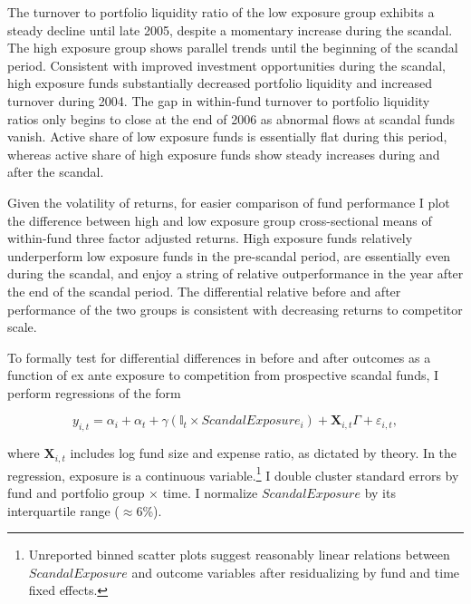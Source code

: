 \documentclass[openany]{book}
\let\rmarkdownfootnote\footnote%
\def\footnote{\protect\rmarkdownfootnote}
\theoremstyle{definition}
\theoremstyle{definition}
\theoremstyle{definition}
\theoremstyle{remark}
\begin{document}
The turnover to portfolio liquidity ratio of the low exposure group
exhibits a steady decline until late 2005, despite a momentary increase
during the scandal. The high exposure group shows parallel trends until
the beginning of the scandal period. Consistent with improved investment
opportunities during the scandal, high exposure funds substantially
decreased portfolio liquidity and increased turnover during 2004. The
gap in within-fund turnover to portfolio liquidity ratios only begins to
close at the end of 2006 as abnormal flows at scandal funds vanish.
Active share of low exposure funds is essentially flat during this
period, whereas active share of high exposure funds show steady
increases during and after the scandal.

Given the volatility of returns, for easier comparison of fund
performance I plot the difference between high and low exposure group
cross-sectional means of within-fund three factor adjusted returns. High
exposure funds relatively underperform low exposure funds in the
pre-scandal period, are essentially even during the scandal, and enjoy a
string of relative outperformance in the year after the end of the
scandal period. The differential relative before and after performance
of the two groups is consistent with decreasing returns to competitor
scale.

To formally test for differential differences in before and after
outcomes as a function of ex ante exposure to competition from
prospective scandal funds, I perform regressions of the form

\begin{equation}
y_{i,t} = \alpha_i + \alpha_t + \gamma \left( \mathbb{I}_t \times ScandalExposure_i \right) + \mathbf{X}_{i,t}\Gamma + \varepsilon_{i,t},
\label{eq:didReg}
\end{equation}

where \(\mathbf{X}_{i,t}\) includes log fund size and expense ratio, as
dictated by theory. In the regression, exposure is a continuous
variable.\footnote{
Unreported binned scatter plots suggest reasonably linear relations between $ScandalExposure$ and outcome variables after residualizing by fund and time fixed effects.
} I double cluster standard errors by fund and portfolio group
\(\times\) time. I normalize \(ScandalExposure\) by its interquartile
range (\(\approx 6\)\%).
\end{document}
